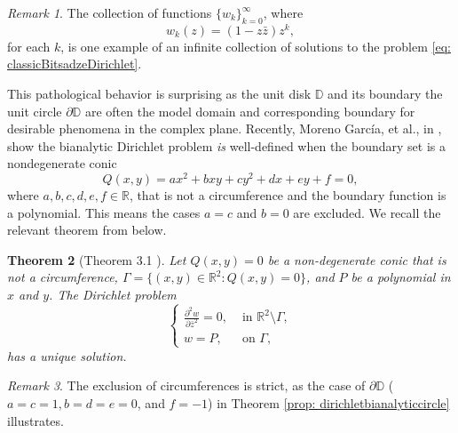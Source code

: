 \documentclass[12pt,reqno]{amsart}
\newtheorem{theorem}{Theorem}[section]
\theoremstyle{definition}
\theoremstyle{remark}
\newtheorem{comm}[theorem]{Remark}
\newcommand{\p}{\partial}
\newcommand{\z}{\bar z}
\newcommand{\disk}{\mathbb{D}}
\begin{document}
            \begin{comm}The collection of functions $\{w_k\}_{k=0}^\infty$, where 
            \[
                w_k(z) = (1-z\z)z^k,
            \]
            for each $k$, is one example of an infinite collection of solutions to the problem \eqref{eq: classicBitsadzeDirichlet}. \end{comm}

            



            
            
            This pathological behavior is surprising as the unit disk $\disk$ and its boundary the unit circle $\p\disk$ are often the model domain and corresponding boundary for desirable phenomena in the complex plane. Recently, Moreno Garc\'ia, et al., in \cite{Dirichletbianalytic}, show the bianalytic Dirichlet problem \textit{is} well-defined when the boundary set is a nondegenerate conic 
            \[
                Q(x,y) = ax^2 + bxy + cy^2 + dx + ey + f = 0,
            \]
            where $a,b,c,d,e,f \in \mathbb{R}$, that is not a circumference and the boundary function is a polynomial. This means the cases $a=c$ and $b = 0$ are excluded. We recall the relevant theorem from \cite{Dirichletbianalytic} below.

            \begin{theorem}[Theorem 3.1 \cite{Dirichletbianalytic}]\label{thm: dirichletbianalyticwellposed}
                Let $Q(x,y) = 0$ be a non-degenerate conic that is not a circumference, $\Gamma = \{(x,y) \in \mathbb{R}^2 : Q(x,y) = 0\}$, and $P$ be a polynomial in $x$ and $y$. The Dirichlet problem 
                \[
                    \begin{cases}
                        \frac{\p^2 w}{\p\z^2}  = 0, & \text{ in } \mathbb{R}^2\setminus \Gamma,\\
                        w = P, & \text{ on } \Gamma,
                    \end{cases}
                \]
                has a unique solution.
            \end{theorem}


            \begin{comm} The exclusion of circumferences is strict, as the case of $\p\disk$ ($a = c = 1, b = d = e = 0$, and $f = -1$) in Theorem \ref{prop: dirichletbianalyticcircle} illustrates. 
            \end{comm}
\end{document}
